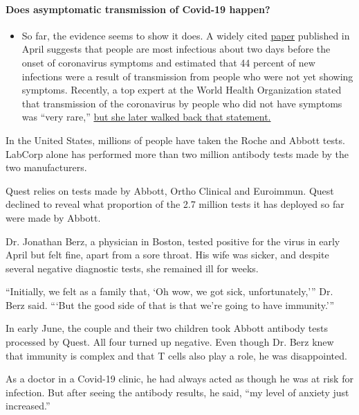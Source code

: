 \begin{itemize}
{  \paragraph{Does asymptomatic transmission of Covid-19
  happen?}\label{does-asymptomatic-transmission-of-covid-19-happen}}

  \begin{itemize}
  \tightlist
  \item
    So far, the evidence seems to show it does. A widely cited
    \href{https://www.nature.com/articles/s41591-020-0869-5}{paper}
    published in April suggests that people are most infectious about
    two days before the onset of coronavirus symptoms and estimated that
    44 percent of new infections were a result of transmission from
    people who were not yet showing symptoms. Recently, a top expert at
    the World Health Organization stated that transmission of the
    coronavirus by people who did not have symptoms was ``very rare,''
    \href{https://www.nytimes.com/2020/06/09/world/coronavirus-updates.html?action=click\&pgtype=Article\&state=default\&region=MAIN_CONTENT_3\&context=storylines_faq\#link-1f302e21}{but
    she later walked back that statement.}
  \end{itemize}
\end{itemize}

In the United States, millions of people have taken the Roche and Abbott
tests. LabCorp alone has performed more than two million antibody tests
made by the two manufacturers.

Quest relies on tests made by Abbott, Ortho Clinical and Euroimmun.
Quest declined to reveal what proportion of the 2.7 million tests it has
deployed so far were made by Abbott.

Dr. Jonathan Berz, a physician in Boston, tested positive for the virus
in early April but felt fine, apart from a sore throat. His wife was
sicker, and despite several negative diagnostic tests, she remained ill
for weeks.

``Initially, we felt as a family that, `Oh wow, we got sick,
unfortunately,''' Dr. Berz said. ```But the good side of that is that
we're going to have immunity.'''

In early June, the couple and their two children took Abbott antibody
tests processed by Quest. All four turned up negative. Even though Dr.
Berz knew that immunity is complex and that T cells also play a role, he
was disappointed.

As a doctor in a Covid-19 clinic, he had always acted as though he was
at risk for infection. But after seeing the antibody results, he said,
``my level of anxiety just increased.''

